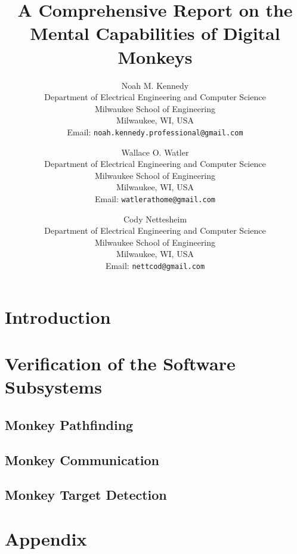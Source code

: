 \documentclass[11pt]{article}
\title{
    A Comprehensive Report on the Mental Capabilities of Digital Monkeys
}
\author{
    Noah M. Kennedy \\[3pt]
    {\small Department of Electrical Engineering and Computer Science} \\
    {\small Milwaukee School of Engineering} \\
    {\small Milwaukee, WI, USA} \\
    {\small Email: {\tt noah.kennedy.professional@gmail.com}} \\[12pt]
    \and
    Wallace O. Watler \\[3pt]
    {\small Department of Electrical Engineering and Computer Science} \\
    {\small Milwaukee School of Engineering} \\
    {\small Milwaukee, WI, USA} \\
    {\small Email: {\tt watlerathome@gmail.com}} \\[12pt]
    \and
    Cody Nettesheim \\[3pt]
    {\small Department of Electrical Engineering and Computer Science} \\
    {\small Milwaukee School of Engineering} \\
    {\small Milwaukee, WI, USA} \\
    {\small Email: {\tt nettcod@gmail.com}} \\[12pt]
}
\date{}
\begin{document}
    \maketitle

    \newpage

    \abstract
    

    \newpage

    \tableofcontents

    \newpage


    \section{Introduction}\label{sec:introduction}
    


    \section{Verification of the Software Subsystems}\label{sec:software-subsystems-results}

    \subsection{Monkey Pathfinding}\label{subsec:monkey-pathfinding}
    

    \subsection{Monkey Communication}\label{subsec:monkey-communication}
    

    \subsection{Monkey Target Detection}\label{subsec:monkey-target-detection}
    

    \section*{Appendix}\label{sec:appendix}
    

    \pagebreak

    \printbibliography
\end{document}
